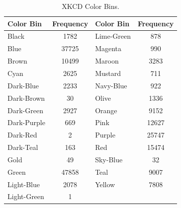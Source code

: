 \begin{table}
  \vspace{-15pt}
  \begin{center}
    \resizebox{0.3\textwidth}{!} {
    \begin{tabular}{@{}lclc@{}}
    \toprule
      Color Bin                        & Frequency                  & Color Bin                       & Frequency \\ \midrule
      \multicolumn{1}{l|}{Black}       & \multicolumn{1}{c||}{1782}  & \multicolumn{1}{l|}{Lime-Green} & 878       \\ \midrule
      \multicolumn{1}{l|}{Blue}        & \multicolumn{1}{c||}{37725} & \multicolumn{1}{l|}{Magenta}    & 990       \\ \midrule
      \multicolumn{1}{l|}{Brown}       & \multicolumn{1}{c||}{10499} & \multicolumn{1}{l|}{Maroon}     & 3283      \\ \midrule
      \multicolumn{1}{l|}{Cyan}        & \multicolumn{1}{c||}{2625}  & \multicolumn{1}{l|}{Mustard}    & 711       \\ \midrule
      \multicolumn{1}{l|}{Dark-Blue}   & \multicolumn{1}{c||}{2233}  & \multicolumn{1}{l|}{Navy-Blue}  & 922       \\ \midrule
      \multicolumn{1}{l|}{Dark-Brown}  & \multicolumn{1}{c||}{30}    & \multicolumn{1}{l|}{Olive}      & 1336      \\ \midrule
      \multicolumn{1}{l|}{Dark-Green}  & \multicolumn{1}{c||}{2927}  & \multicolumn{1}{l|}{Orange}     & 9152      \\ \midrule
      \multicolumn{1}{l|}{Dark-Purple} & \multicolumn{1}{c||}{669}   & \multicolumn{1}{l|}{Pink}       & 12627     \\ \midrule
      \multicolumn{1}{l|}{Dark-Red}    & \multicolumn{1}{c||}{2}     & \multicolumn{1}{l|}{Purple}     & 25747     \\ \midrule
      \multicolumn{1}{l|}{Dark-Teal}   & \multicolumn{1}{c||}{163}   & \multicolumn{1}{l|}{Red}        & 15474     \\ \midrule
      \multicolumn{1}{l|}{Gold}        & \multicolumn{1}{c||}{49}    & \multicolumn{1}{l|}{Sky-Blue}   & 32        \\ \midrule
      \multicolumn{1}{l|}{Green}       & \multicolumn{1}{c||}{47858} & \multicolumn{1}{l|}{Teal}       & 9007      \\ \midrule
      \multicolumn{1}{l|}{Light-Blue}  & \multicolumn{1}{c||}{2078}  & \multicolumn{1}{l|}{Yellow}     & 7808      \\ \midrule
      \multicolumn{1}{l|}{Light-Green} & \multicolumn{1}{c|}{1}     & \multicolumn{2}{l}{}                        \\ \cmidrule(r){1-2}
    \end{tabular}}
  \end{center}
  \vspace{-15pt}
  \caption[XKCD Color Survey: Color Bins]{XKCD Color Bins.}
  \label{table:colorbins}
\end{table}
